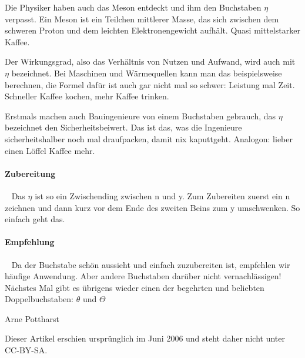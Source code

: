 {Die Physiker haben auch das Meson entdeckt und ihm den Buchstaben $\eta$ verpasst.
Ein Meson ist ein Teilchen mittlerer Masse, das sich zwischen dem schweren
Proton und dem leichten Elektronengewicht aufhält. Quasi mittelstarker Kaffee. 

Der Wirkungsgrad, also das Verhältnis von Nutzen und Aufwand, wird auch mit
$\eta$
bezeichnet. Bei Maschinen und Wärmequellen kann man das beispielsweise
berechnen, die Formel dafür ist auch gar nicht mal so schwer: Leistung mal
Zeit. Schneller Kaffee kochen, mehr Kaffee trinken. 

Erstmals machen auch Bauingenieure von einem Buchstaben gebrauch, das $\eta$
bezeichnet den Sicherheitsbeiwert. Das ist das, was die Ingenieure
sicherheitshalber noch mal draufpacken, damit nix kaputtgeht. Analogon: lieber
einen Löffel Kaffee mehr. 
\paragraph{Zubereitung}~\newline
Das $\eta$ ist so ein Zwischending zwischen n und y. Zum Zubereiten zuerst ein n
zeichnen und dann kurz vor dem Ende des zweiten Beins zum y umschwenken. So
einfach geht das. 
\paragraph{Empfehlung}~\newline
Da der Buchstabe schön aussieht und einfach zuzubereiten ist, empfehlen wir
häufige Anwendung. Aber andere Buchstaben darüber nicht vernachlässigen! 
Nächstes Mal gibt es übrigens wieder einen der begehrten und beliebten
Doppelbuchstaben: $\theta$ und $\Theta$}
{Arne Pottharst}


Dieser Artikel erschien ursprünglich im Juni 2006 und steht daher nicht unter
CC-BY-SA.
